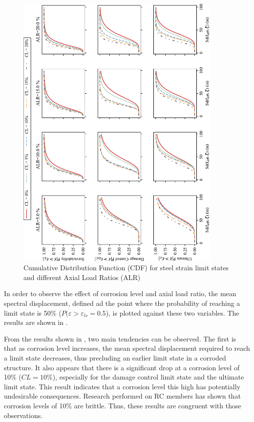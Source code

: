 \begin{figure}[htbp]
	\centering
	\includegraphics[width=0.9\textwidth]{VAC Thesis 2.0/Chapter-5/figs/CDF_summary.pdf}
	\caption{Cumulative Distribution Function (CDF) for steel strain limit states and different Axial Load Ratios (ALR)}
	\label{fig:CDF_strain_vs_ALR}
\end{figure}

In order to observe the effect of corrosion level and axial load ratio, the mean spectral displacement, defined ad the point where the probability of reaching a limit state is 50\% ($P(\varepsilon>\varepsilon_{ls}=0.5$), is plotted against these two variables. The results are shown in .

From the results shown in , two main tendencies can be observed. The first is that as corrosion level increases, the mean spectral displacement required to reach a limit state decreases, thus precluding an earlier limit state in a corroded structure. It also appears that there is a significant drop at a corrosion level of 10\% ($CL=10\%$), especially for the damage control limit state and the ultimate limit state. This result indicates that a corrosion level this high has potentially undesirable consequences. Research performed on RC members has shown that corrosion levels of 10\% are brittle. Thus, these results are congruent with those observations.

